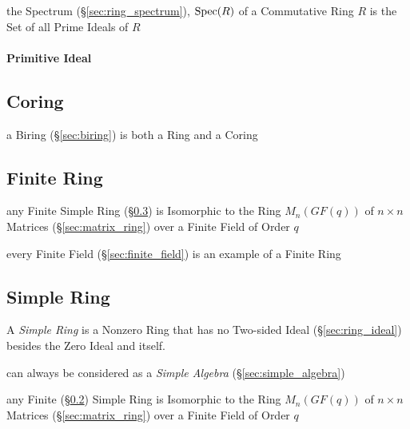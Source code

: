 the Spectrum (\S\ref{sec:ring_spectrum}), $\mathrm{Spec}(R)$ of a Commutative Ring $R$
is the Set of all Prime Ideals of $R$



\paragraph{Primitive Ideal}\label{sec:primitive_ideal}\hfill



\subsection{Coring}\label{sec:coring}

a Biring (\S\ref{sec:biring}) is both a Ring and a Coring



\subsection{Finite Ring}\label{sec:finite_ring}

any Finite Simple Ring (\S\ref{sec:simple_ring}) is Isomorphic to the Ring
$M_n(GF(q))$ of $n \times n$ Matrices (\S\ref{sec:matrix_ring}) over a Finite
Field of Order $q$

every Finite Field (\S\ref{sec:finite_field}) is an example of a Finite Ring



\subsection{Simple Ring}\label{sec:simple_ring}

A \emph{Simple Ring} is a Nonzero Ring that has no Two-sided Ideal
(\S\ref{sec:ring_ideal}) besides the Zero Ideal and itself.

can always be considered as a \emph{Simple Algebra} (\S\ref{sec:simple_algebra})

any Finite (\S\ref{sec:finite_ring}) Simple Ring is Isomorphic to the Ring
$M_n(GF(q))$ of $n \times n$ Matrices (\S\ref{sec:matrix_ring}) over a Finite
Field of Order $q$

